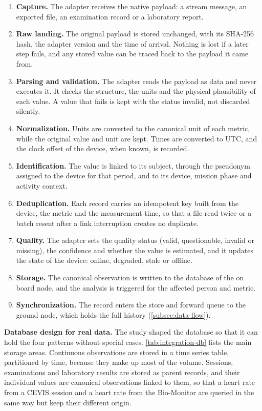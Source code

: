 \begin{enumerate}
\item \textbf{Capture.} The adapter receives the native payload: a stream message, an exported file, an examination record or a laboratory report.
\item \textbf{Raw landing.} The original payload is stored unchanged, with its SHA-256 hash, the adapter version and the time of arrival. Nothing is lost if a later step fails, and any stored value can be traced back to the payload it came from.
\item \textbf{Parsing and validation.} The adapter reads the payload as data and never executes it. It checks the structure, the units and the physical plausibility of each value. A value that fails is kept with the status invalid, not discarded silently.
\item \textbf{Normalization.} Units are converted to the canonical unit of each metric, while the original value and unit are kept. Times are converted to UTC, and the clock offset of the device, when known, is recorded.
\item \textbf{Identification.} The value is linked to its subject, through the pseudonym assigned to the device for that period, and to its device, mission phase and activity context.
\item \textbf{Deduplication.} Each record carries an idempotent key built from the device, the metric and the measurement time, so that a file read twice or a batch resent after a link interruption creates no duplicate.
\item \textbf{Quality.} The adapter sets the quality status (valid, questionable, invalid or missing), the confidence and whether the value is estimated, and it updates the state of the device: online, degraded, stale or offline.
\item \textbf{Storage.} The canonical observation is written to the database of the on board node, and the analysis is triggered for the affected person and metric.
\item \textbf{Synchronization.} The record enters the store and forward queue to the ground node, which holds the full history (\ref{subsec:data-flow}).
\end{enumerate}

\medskip\noindent\textbf{Database design for real data.} The study shaped the database so that it can hold the four patterns without special cases. \ref{tab:integration-db} lists the main storage areas. Continuous observations are stored in a time series table, partitioned by time, because they make up most of the volume. Sessions, examinations and laboratory results are stored as parent records, and their individual values are canonical observations linked to them, so that a heart rate from a CEVIS session and a heart rate from the Bio-Monitor are queried in the same way but keep their different origin.

